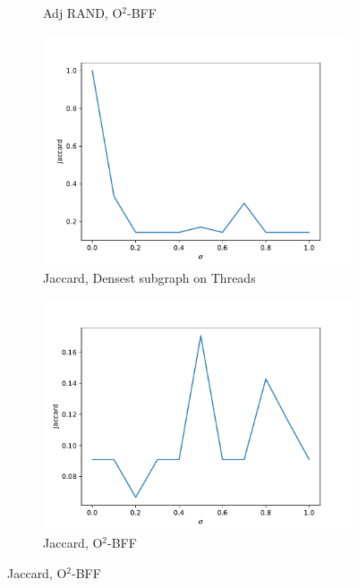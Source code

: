 \documentclass{beamer}
\begin{document}
\begin{frame}[c]
\begin{figure}
\begin{center}
\begin{subfigure}[t]{0.3\textwidth}
				\caption{Adj RAND, O$^{2}$-BFF}
				\label{fig:adj-rand-o2_bff1}
			\end{subfigure}
		\end{center}
		\begin{center}
			\begin{subfigure}[t]{0.3\textwidth}
				\centering
				\includegraphics[width=\textwidth]{out/synthetic_densest_nc/model2_sigmas_jaccard.pdf}
				\caption{Jaccard, Densest subgraph on Threads}
				\label{fig:out/synthetic_densest_nc/model2_sigmas_jaccard.pdf}
			\end{subfigure}
			\begin{subfigure}[t]{0.3\textwidth}
				\centering
				\includegraphics[width=\textwidth]{out/synthetic_o2_bff/model2_sigmas_jaccard.pdf}
				\caption{Jaccard, O$^{2}$-BFF}
				\label{fig:jacc-o2_bff1}
			\end{subfigure}
		\end{center}
	\end{figure}

\end{frame}
\end{document}
